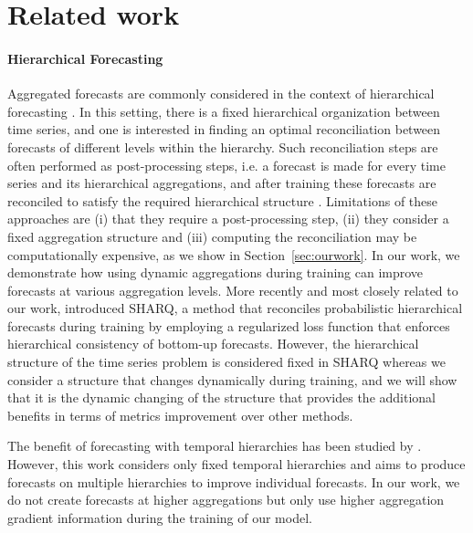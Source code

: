 \documentclass{article}
\begin{document}
\section{Related work}
  \label{sec:relwork}
  \paragraph{Hierarchical Forecasting} Aggregated forecasts are commonly considered in the context of hierarchical forecasting \cite{hyndman_optimal_2011}. In this setting, there is a fixed hierarchical organization between time series, and one is interested in finding an optimal reconciliation between forecasts of different levels within the hierarchy. Such reconciliation steps are often performed as post-processing steps, i.e. a forecast is made for every time series and its hierarchical aggregations, and after training these forecasts are reconciled to satisfy the required hierarchical structure \cite{hyndman_optimal_2011,  hyndman_fast_2016, taieb_coherent_2017, bentaieb_regularized_2019, wickramasuriya_optimal_2019, panagiotelis_forecast_2021}. Limitations of these approaches are (i) that they require a post-processing step, (ii) they consider a fixed aggregation structure and (iii) computing the reconciliation may be computationally expensive, as we show in Section~\ref{sec:ourwork}. In our work, we demonstrate how using dynamic aggregations during training can improve forecasts at various aggregation levels. More recently and most closely related to our work, \citet{han_simultaneously_2021} introduced SHARQ, a method that reconciles probabilistic hierarchical forecasts during training by employing a regularized loss function that enforces hierarchical consistency of bottom-up forecasts. However, the hierarchical structure of the time series problem is considered fixed in SHARQ whereas we consider a structure that changes dynamically during training, and we will show that it is the dynamic changing of the structure that provides the additional benefits in terms of metrics improvement over other methods. 

  The benefit of forecasting with temporal hierarchies has been studied by \cite{athanasopoulos_forecasting_2017}. However, this work considers only fixed temporal hierarchies and aims to produce forecasts on multiple hierarchies to improve individual forecasts. In our work, we do not create forecasts at higher aggregations but only use higher aggregation gradient information during the training of our model.
\end{document}
